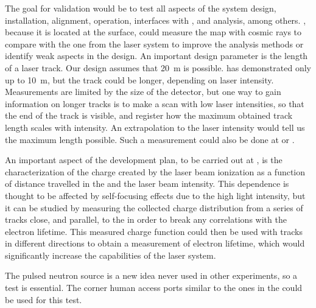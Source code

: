 The goal for validation would be to test all aspects of the system design, installation, alignment, operation, interfaces with , and analysis, among others. , because it is located at the surface, could measure the \efield map with cosmic rays to compare with the one from the laser system to improve the analysis methods or identify weak aspects in the design. An important design parameter is the length of a laser track. Our design assumes that \SI{20}{\m} is possible.  has demonstrated only up to \SI{10}{\m}, but the track could be longer, depending on laser intensity. Measurements are limited by the size of the detector, but one way to gain information on longer tracks is to make a scan with low laser intensities, so that the end of the track is  visible, and register how the maximum obtained track length scales with intensity. An extrapolation to the   laser intensity would tell us the maximum length possible. Such a measurement could also be done at  or .

An important aspect of the development plan, to be carried out at , is the characterization of the charge created by the laser beam ionization as a function of distance travelled in the  and the laser beam intensity. This dependence is thought to be affected by self-focusing effects due to the high light intensity, but it can be studied by measuring the collected charge distribution from a series of tracks close, and parallel, to the  in order to break any correlations with the electron lifetime. This measured charge function could then be used with tracks in different directions to obtain a measurement of electron lifetime, which would significantly increase the capabilities of the laser system. 

The pulsed neutron source is a new idea never used in other experiments, so a  test is essential. The corner human access ports similar to the ones in the   could be used for this test.

